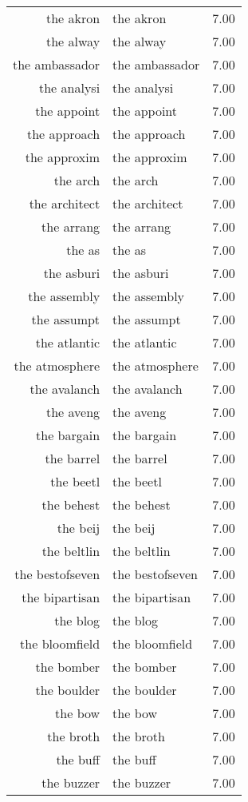 \begin{table}[ht]
\begin{tabular}{rlr}
  the akron & the akron & 7.00 \\ 
  the alway & the alway & 7.00 \\ 
  the ambassador & the ambassador & 7.00 \\ 
  the analysi & the analysi & 7.00 \\ 
  the appoint & the appoint & 7.00 \\ 
  the approach & the approach & 7.00 \\ 
  the approxim & the approxim & 7.00 \\ 
  the arch & the arch & 7.00 \\ 
  the architect & the architect & 7.00 \\ 
  the arrang & the arrang & 7.00 \\ 
  the as & the as & 7.00 \\ 
  the asburi & the asburi & 7.00 \\ 
  the assembly & the assembly & 7.00 \\ 
  the assumpt & the assumpt & 7.00 \\ 
  the atlantic & the atlantic & 7.00 \\ 
  the atmosphere & the atmosphere & 7.00 \\ 
  the avalanch & the avalanch & 7.00 \\ 
  the aveng & the aveng & 7.00 \\ 
  the bargain & the bargain & 7.00 \\ 
  the barrel & the barrel & 7.00 \\ 
  the beetl & the beetl & 7.00 \\ 
  the behest & the behest & 7.00 \\ 
  the beij & the beij & 7.00 \\ 
  the beltlin & the beltlin & 7.00 \\ 
  the bestofseven & the bestofseven & 7.00 \\ 
  the bipartisan & the bipartisan & 7.00 \\ 
  the blog & the blog & 7.00 \\ 
  the bloomfield & the bloomfield & 7.00 \\ 
  the bomber & the bomber & 7.00 \\ 
  the boulder & the boulder & 7.00 \\ 
  the bow & the bow & 7.00 \\ 
  the broth & the broth & 7.00 \\ 
  the buff & the buff & 7.00 \\ 
  the buzzer & the buzzer & 7.00 \\ 

\end{tabular}
\end{table}
